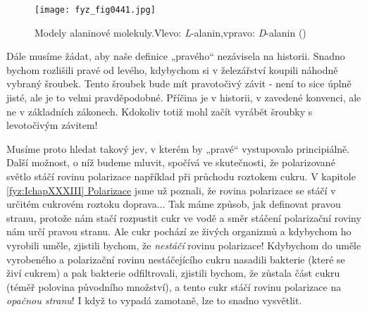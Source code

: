     \begin{figure}[ht!] %
      \centering
      \texttt{[image: fyz\_fig0441.jpg]}
      \caption{Modely alaninové molekuly.Vlevo: \emph{L}-alanin,vpravo: \emph{D}-alanin
               (\cite[s.~704]{Feynman01})}
      \label{fyz:fig0441}
    \end{figure}

    Dále musíme žádat, aby naše deﬁnice „pravého“ nezávisela na historii. Snadno bychom rozlišili
    pravé od levého, kdybychom si v železářství koupili náhodně vybraný šroubek. Tento šroubek bude
    mít pravotočivý závit - není to sice úplně jisté, ale je to velmi pravděpodobné. Příčina je v
    historii, v zavedené konvenci, ale ne v základních zákonech. Kdokoliv totiž mohl začít vyrábět
    šroubky s levotočivým závitem! 

    Musíme proto hledat takový jev, v kterém by „pravé“ vystupovalo principiálně. Další možnost, o
    níž budeme mluvit, spočívá ve skutečnosti, že polarizované světlo stáčí rovinu polarizace
    například při průchodu roztokem cukru. V kapitole
    \hyperref[fyz:IchapXXXIII]{\ref{fyz:IchapXXXIII} {Polarizace}} jsme už poznali, že rovina
    polarizace se stáčí v určitém cukrovém roztoku doprava... Tak máme způsob, jak definovat pravou
    stranu, protože nám stačí rozpustit cukr ve vodě a směr stáčení polarizační roviny nám určí
    pravou stranu. Ale cukr pochází ze živých organizmů a kdybychom ho vyrobili uměle, zjistili
    bychom, že \emph{nestáčí} rovinu polarizace! Kdybychom do uměle vyrobeného a polarizační rovinu
    nestáčejícího cukru nasadili bakterie (které se živí cukrem) a pak bakterie odﬁltrovali,
    zjistili bychom, že zůstala část cukru (téměř polovina původního množství), a tento cukr stáčí
    rovinu polarizace na \emph{opačnou stranu}! I když to vypadá zamotaně, lze to snadno vysvětlit.

